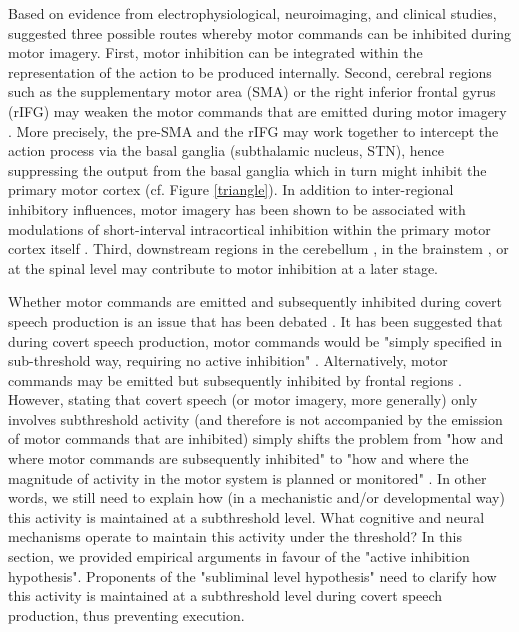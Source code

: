 \documentclass[utf8]{template/frontiersSCNS} %
\begin{document}
Based on evidence from electrophysiological, neuroimaging, and clinical studies, \cite{guillot_imagining_2012} suggested three possible routes whereby motor commands can be inhibited during motor imagery. First, motor inhibition can be integrated within the representation of the action to be produced internally. Second, cerebral regions such as the supplementary motor area (SMA) \citep{kasess_suppressive_2008} or the right inferior frontal gyrus (rIFG) may weaken the motor commands that are emitted during motor imagery \citep[e.g.,][]{angelini_motor_2015, angelini_proactive_2016}. More precisely, the pre-SMA and the rIFG may work together to intercept the action process via the basal ganglia (subthalamic nucleus, STN), hence suppressing the output from the basal ganglia which in turn might inhibit the primary motor cortex \citep{aron_reactive_2011} (cf. Figure \ref{triangle}). In addition to inter-regional inhibitory influences, motor imagery has been shown to be associated with modulations of short-interval intracortical inhibition within the primary motor cortex itself \citep{neige_unravelling_2020}.
Third, downstream regions in the cerebellum \citep[e.g.,][]{lotze_activation_1999}, in the brainstem \citep[e.g.,][]{jeannerod_neural_2001, jeannerod_motor_2006}, or at the spinal level may contribute to motor inhibition at a later stage.

Whether motor commands are emitted and subsequently inhibited during covert speech production is an issue that has been debated \citep[e.g.,][]{geva_inner_2018}. It has been suggested that during covert speech production, motor commands would be "simply specified in sub-threshold way, requiring no active inhibition" \citep{geva_inner_2018}. Alternatively, motor commands may be emitted but subsequently inhibited by frontal regions \citep[e.g.,][]{loevenbruck_cognitive_2018, grandchamp_condialint_2019}. However, stating that covert speech (or motor imagery, more generally) only involves subthreshold activity (and therefore is not accompanied by the emission of motor commands that are inhibited) simply shifts the problem from "how and where motor commands are subsequently inhibited" to "how and where the magnitude of activity in the motor system is planned or monitored" \citep[see also][]{scheil_motor_2018}. In other words, we still need to explain how (in a mechanistic and/or developmental way) this activity is maintained at a subthreshold level. What cognitive and neural mechanisms operate to maintain this activity under the threshold? In this section, we provided empirical arguments in favour of the "active inhibition hypothesis". Proponents of the "subliminal level hypothesis" need to clarify how this activity is maintained at a subthreshold level during covert speech production, thus preventing execution.
\end{document}
